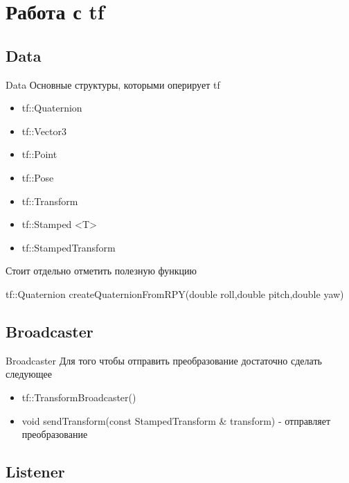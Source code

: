 \documentclass[9pt]{beamer}
\begin{document}
\section{Работа с tf}

\subsection{Data}

\begin{frame}{Data}
Основные структуры, которыми оперирует tf
  \begin{itemize}
    \item
    {
      tf::Quaternion
    }
    \item
    {
      tf::Vector3
    }
    \item
    {
      tf::Point
    }
    \item
    {
      tf::Pose
    }
    \item
    {
      tf::Transform
    }
    \item
    {
     tf::Stamped <T>
    }
    \item
    {
     tf::StampedTransform
    }
  \end{itemize}

Стоит отдельно отметить полезную функцию 

tf::Quaternion createQuaternionFromRPY(double roll,double pitch,double yaw)
\end{frame}

\subsection{Broadcaster}


\begin{frame}{Broadcaster}
Для того чтобы отправить преобразование достаточно сделать следующее
  \begin{itemize}
    \item
    {
      tf::TransformBroadcaster()
    }
    \item
    {
      void sendTransform(const StampedTransform \& transform) - отправляет преобразование
    }
  \end{itemize}
\end{frame}

\subsection{Listener}
\end{document}
